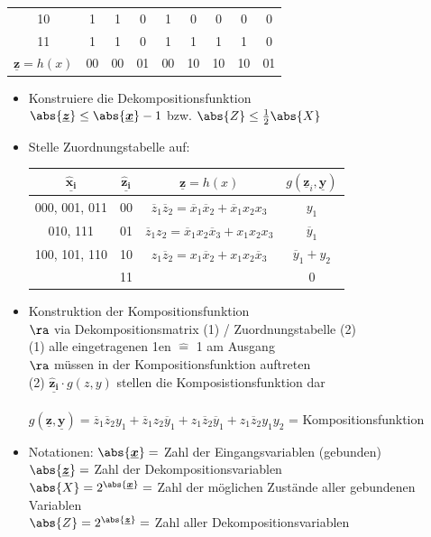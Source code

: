 \documentclass[6pt,a4paper]{scrartcl}
\renewcommand{\vec}[1]{\ensuremath{\underline{\boldsymbol {#1}}}}
\renewcommand{\vec}[1]{\ensuremath{\underline{\boldsymbol {#1}}}}
\begin{document}
\begin{multicols}{3}
\begin{tabular}{c | c | c | c | c | c | c | c | c }
			10 & 1 & 1 & 0 & 1 & 0 & 0 & 0 & 0 \\
			11 & 1 & 1 & 0 & 1 & 1 & 1 & 1 & 0 \\ \midrule
			$\vec z = h(x)$ & 00 & 00 & 01 & 00 & 10 & 10 & 10 & 01
		\end{tabular}
\begin{itemize}
	\item Konstruiere die Dekompositionsfunktion \\
	$ \abs{\vec z} \le \abs{\vec x}  -1 $ bzw. $\abs{Z} \le \frac{1}{2} \abs{X}$
	\item Stelle Zuordnungstabelle auf:\\
		\begin{tabular}{ c | c | c | c }
		$\vec{\hat x_i}$ & $\vec{\hat z_i}$ & $\vec z = h(x)$ & $ g(\vec z_i, \vec y) $ \\ \midrule
		000, 001, 011 & 00 & $\overline z_1 \overline z_2 = \overline x_1 \overline x_2 + \overline x_1 x_2 x_3$ & $y_1 $\\
		010, 111 & 01 &$ \overline z_1 z_2 = \overline x_1 x_2 \overline x_3 + x_1 x_2 x_3$  & $\overline y_1$ \\
		100, 101, 110 & 10 & $z_1 \overline z_2 = x_1 \overline x_2 + x_1 x_2 \overline x_3$ & $\overline y_1 + y_2$ \\
		& 11 & & 0
		\end{tabular}
		
	\item Konstruktion der Kompositionsfunktion \\
	$\ra $ via Dekompositionsmatrix (1) / Zuordnungstabelle (2) \\
		(1) alle eingetragenen 1en $\hat =$ 1 am Ausgang \\
			$\ra$ müssen in der Kompositionsfunktion auftreten \\
		(2) $\vec{\hat z_i} \cdot g(z,y)$ stellen die Komposistionsfunktion dar \\
		\\
	$g(\vec z, \vec y) = \overline z_1 \overline z_2 y_1 + \overline z_1 z_2 \overline y_1 + z_1 \overline z_2 \overline y_1 + z_1 \overline z_2 y_1 y_2 $ = Kompositionsfunktion
	
	\item Notationen:
		$\abs{\vec x} = $ Zahl der Eingangsvariablen (gebunden) \\
		$\abs{\vec z} = $ Zahl der Dekompositionsvariablen \\
		$\abs{X} = 2^{\abs{\vec x}} =$ Zahl der möglichen Zustände aller gebundenen Variablen \\
		$\abs{Z} = 2^{\abs{\vec z}} = $ Zahl aller Dekompositionsvariablen
\end{itemize}


\end{multicols}
\end{document}
